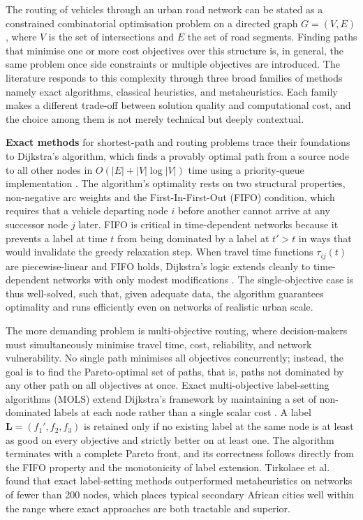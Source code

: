 \documentclass[paper=A4, 12pt, mathscr]{report}
\begin{document}
	The routing of vehicles through an urban road network can be stated as a
	constrained combinatorial optimisation problem on a directed graph
	$G=(V,E)$, where $V$ is the set of intersections and $E$ the set of road
	segments. Finding paths that minimise one or more cost objectives over this
	structure is, in general, the same problem once side constraints or multiple
	objectives are introduced. The literature responds to this complexity through
	three broad families of methods namely exact algorithms, classical heuristics, and
	metaheuristics. Each family makes a different trade-off between solution
	quality and computational cost, and the choice among them is not merely
	technical but deeply contextual.
	
	\textbf{Exact methods} for shortest-path and routing problems trace their
	foundations to Dijkstra's algorithm, which finds a provably optimal path
	from a source node to all other nodes in $O(|E|+|V|\log|V|)$ time using a
	priority-queue implementation \cite{hao2024}. The algorithm's optimality
	rests on two structural properties, non-negative arc weights and the
	First-In-First-Out (FIFO) condition, which requires that a vehicle departing
	node $i$ before another cannot arrive at any successor node $j$ later. FIFO
	is critical in time-dependent networks because it prevents a label at time
	$t$ from being dominated by a label at $t' > t$ in ways that would
	invalidate the greedy relaxation step. When travel time functions
	$\tau_{ij}(t)$ are piecewise-linear and FIFO holds, Dijkstra's logic extends
	cleanly to time-dependent networks with only modest modifications
	\cite{humagain}. The single-objective case is thus well-solved, such that, given
	adequate data, the algorithm guarantees optimality and runs efficiently even
	on networks of realistic urban scale.
	
	The more demanding problem is multi-objective routing, where decision-makers
	must simultaneously minimise travel time, cost, reliability, and network
	vulnerability. No single path minimises all objectives concurrently;
	instead, the goal is to find the Pareto-optimal set of paths, that is, paths
	not dominated by any other path on all objectives at once. Exact
	multi-objective label-setting algorithms (MOLS) extend Dijkstra's framework
	by maintaining a set of non-dominated labels at each node rather than a
	single scalar cost \cite{14,16}. A label
	$\mathbf{L}=(f_1', f_2, f_3)$ is retained only if no existing label at the
	same node is at least as good on every objective and strictly better on at
	least one. The algorithm terminates with a complete Pareto front, and its
	correctness follows directly from the FIFO property and the monotonicity of
	label extension. Tirkolaee et al.\ \cite{tirkolaee2020} found that exact
	label-setting methods outperformed metaheuristics on networks of fewer than
	200 nodes, which places typical secondary African cities well within the
	range where exact approaches are both tractable and superior.
	
\end{document}
